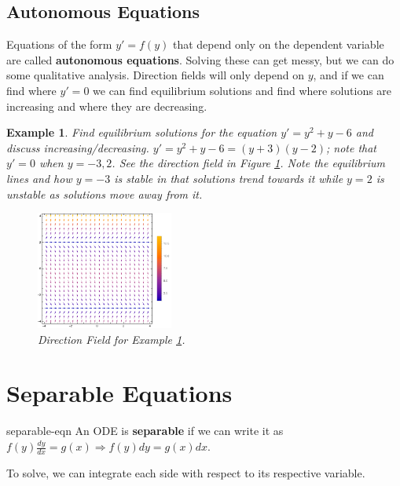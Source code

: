\documentclass[letterpaper, 11pt, openany]{book}
\theoremstyle{mytheoremstyle}
\theoremstyle{myexamplestyle}
\newtheorem{example}{Example}[section]
\begin{document}
\subsection{Autonomous Equations}
Equations of the form \(y' = f(y)\) that depend only on the dependent variable are called \textbf{autonomous equations}. Solving these can get messy, but we can do some qualitative analysis. Direction fields will only depend on \(y\), and if we can find where \(y' = 0\) we can find equilibrium solutions and find where solutions are increasing and where they are decreasing.

\begin{example}\label{e:de-aut-dir-field}
    Find equilibrium solutions for the equation \(y' = y^{2} + y - 6\) and discuss increasing/decreasing.
    \(y' = y^{2} + y - 6 = (y+3)(y-2)\); note that \(y'=0\) when \(y=-3,2\). See the direction field in Figure \ref{f:de-aut-dir-field}. Note the equilibrium lines and how \(y = -3\) is stable in that solutions trend towards it while \(y=2\) is unstable as solutions move away from it.
    \begin{figure}[htbp]
        \centering
            \includegraphics[width=0.4\textwidth]{Figures/de-aut-dfield.pdf}
        \caption{Direction Field for Example \ref{e:de-aut-dir-field}.}
        \label{f:de-aut-dir-field}
    \end{figure}
\end{example}

\section{Separable Equations}
\setcounter{figure}{0}
\begin{definition}{}{separable-eqn}
    An ODE is \textbf{separable} if we can write it as \(f(y)\frac{dy}{dx} = g(x) \Rightarrow f(y)dy = g(x)dx\).
\end{definition}

To solve, we can integrate each side with respect to its respective variable. \faSmile
\end{document}
